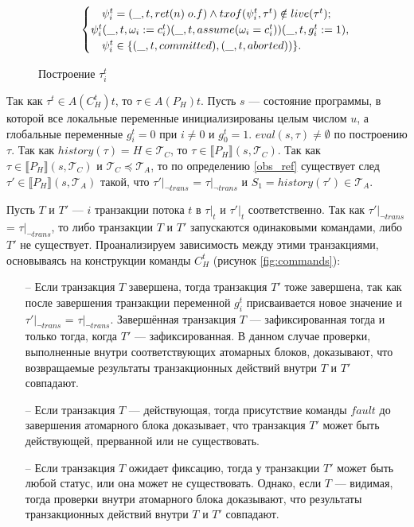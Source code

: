 \begin{myproof}
\begin{figure}
\begin{align*}
\begin{cases}
                                    & \psi^t_i = (\_,t, ret(n) \; o.f) \land txof(\psi^t_i, \tau^t) \notin live(\tau^t); \\
    \mathrlap{\psi^t_i(\_,t,\omega_i := c^t_i)(\_,t,assume(\omega_i = c^t_i))(\_,t,g^t_i := 1),}\\
                                    & \psi^t_i \in \{(\_,t,committed), (\_,t,aborted))\}.       
  \end{cases}
\end{align*}
\caption{Построение $\tau^t_i$}
\label{fig:subtraces}
\end{figure}
Так как $\tau^t \in A(C^t_H)t$, то $\tau \in A(P_H)t$. Пусть $s$ --- состояние программы, в которой все локальные переменные инициализированы целым числом $u$, а глобальные переменные $g^t_i = 0$ при $i \neq 0$ и $g^t_0 = 1$. $eval(s,\tau) \neq \emptyset$ по построению $\tau$. Так как $history(\tau) = H \in \mathcal{T}_C$, то $\tau \in \llbracket P_H \rrbracket(s,\mathcal{T}_C)$. Так как $\tau \in \llbracket P_H \rrbracket(s,\mathcal{T}_C)$ и $\mathcal{T}_C \preceq \mathcal{T}_A$, то по определению \ref{obs_ref} существует след $\tau' \in \llbracket P_H \rrbracket(s,\mathcal{T}_A)$ такой, что $\tau'|_{\neg trans}$ = $\tau|_{\neg trans}$ и $S_1 = history(\tau') \in \mathcal{T}_A$.

Пусть $T$ и $T'$ --- $i$ транзакции потока $t$ в $\tau|_t$ и $\tau'|_t$ соответственно. Так как $\tau'|_{\neg trans}$ = $\tau|_{\neg trans}$, то либо транзакции $T$ и $T'$ запускаются одинаковыми командами, либо $T'$ не существует. Проанализируем зависимость между этими транзакциями, основываясь на конструкции команды $C^t_H$ (рисунок \ref{fig:commands}):
\begin{itemize}
\item[--] Если транзакция $T$ завершена, тогда транзакция $T'$ тоже завершена, так как после завершения транзакции переменной $g^t_i$ присваивается новое значение и $\tau'|_{\neg trans}$ = $\tau|_{\neg trans}$. Завершённая транзакция $T$ --- зафиксированная тогда и только тогда, когда $T'$ --- зафиксированная. В данном случае проверки, выполненные внутри соответствующих атомарных блоков, доказывают, что возвращаемые результаты транзакционных действий внутри $T$ и $T'$ совпадают.
\item[--] Если транзакция $T$ --- действующая, тогда присутствие команды $fault$ до завершения атомарного блока доказывает, что транзакция $T'$ может быть действующей, прерванной или не существовать. 
\item[--] Если транзакция $T$ ожидает фиксацию, тогда у транзакции $T'$ может быть любой статус, или она может не существовать. Однако, если $T$  --- видимая, тогда проверки внутри атомарного блока доказывают, что результаты транзакционных действий внутри $T$ и $T'$ совпадают.
\end{itemize}


\end{myproof}
